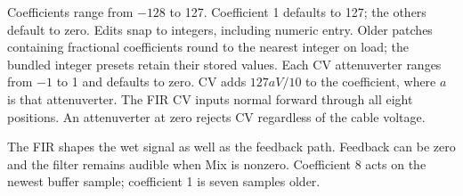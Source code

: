 Coefficients range from $-128$ to 127. Coefficient 1 defaults to 127; the
others default to zero. Edits snap to integers, including numeric entry.
Older patches containing fractional coefficients round to the nearest
integer on load; the bundled integer presets retain their stored values.
Each CV attenuverter ranges from $-1$ to 1 and
defaults to zero. CV adds $127aV/10$ to the coefficient, where $a$ is that
attenuverter. The FIR CV inputs normal forward through all eight positions.
An attenuverter at zero rejects CV regardless of the cable voltage.

The FIR shapes the wet signal as well as the feedback path. Feedback can be
zero and the filter remains audible when Mix is nonzero. Coefficient 8 acts
on the newest buffer sample; coefficient 1 is seven samples older.
